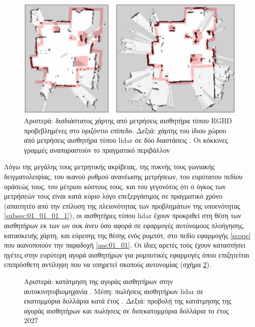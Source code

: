 \begin{figure}\centering
  \includegraphics[scale=0.5]{./figures/parts/01/chapters/01/sections/01/rgbd_lidar_map.png}
  \caption{\small Αριστερά: δισδιάστατος χάρτης από μετρήσεις αισθητήρα τύπου
           RGBD προβεβλημένες στο οριζόντιο επίπεδο. Δεξιά: χάρτης του ίδιου
           χώρου από μετρήσεις αισθητήρα τύπου lidar σε δύο διαστάσεις
           \cite{Oliver2012}. Οι κόκκινες γραμμές αναπαραστούν το πραγματικό
           περιβάλλον}
  \label{fig:rgbd_lidar_map}
\end{figure}

Λόγω της μεγάλης τους μετρητικής ακρίβειας, της πυκνής τους γωνιακής
δειγματολειψίας, του ικανού ρυθμού ανανέωσης μετρήσεων, του ευρύτατου πεδίου
οράσεώς τους, του μέτριου κόστους τους, και του γεγονότος ότι ο όγκος των
μετρήσεών τους είναι κατά κύριο λόγο επεξεργάσιμος σε πραγματικό χρόνο
(απαιτητέο από την επίλυση της πλειονότητας των προβλημάτων της υποενότητας
\ref{subsec:01_01_01_1}), οι αισθητήρες τύπου lidar έχουν προκριθεί στη θέση των
αισθητήρων εκ των ων ουκ άνευ όσο αφορά σε εφαρμογές αυτόνομους πλοήγησης,
κατασκευής χάρτη, και εύρεσης της θέσης ενός ρομπότ, στο πεδίο εφαρμογής
\ref{scope} που ικανοποιούν την παραδοχή \ref{ass:01_01}. Οι ίδιες αρετές τούς
έχουν καταστήσει ηγέτες στην ευρύτερη αγορά αισθητήρων για ρομποτικές εφαρμογές
όπου επιζητείται επιπρόσθετη αντίληψη που να υπηρετεί σκοπούς αυτονομίας (σχήμα
\ref{fig:lidar_share}).


\begin{figure}\centering
  
  \caption{\small Αριστερά: κατάτμηση της αγοράς αισθητήρων στην
           αυτοκινητοβιομηχανία \cite{Sighencea2021}. Μέση: πωλήσεις αισθητήρων
           lidar σε εκατομμύρια δολλάρια κατά έτος \cite{statista1}. Δεξιά:
           προβολή της κατάτμησης της αγοράς αισθητήρων και πωλήσεις σε
           δισεκατομμύρια δολλάρια το έτος 2027 \cite{statista2}}
  \label{fig:lidar_share}
\end{figure}


